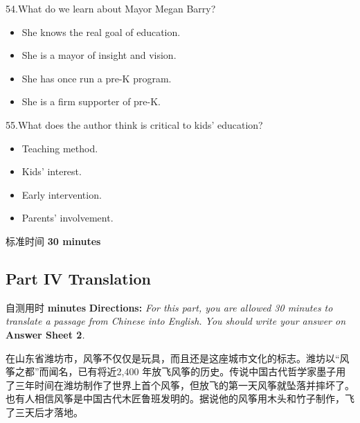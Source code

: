 \documentclass[UTF8,11pt]{ctexart}
\begin{document}
54.What do we learn about Mayor Megan Barry?


\begin{itemize}[leftmargin=2em,itemsep=.2em,topsep=.4em]\item[A.] She knows the real goal of education.
\item[B.] She is a mayor of insight and vision.
\item[C.] She has once run a pre-K program.
\item[D.] She is a firm supporter of pre-K.
\end{itemize}

55.What does the author think is critical to kids’ education?


\begin{itemize}[leftmargin=2em,itemsep=.2em,topsep=.4em]\item[A.] Teaching method.
\item[B.] Kids’ interest.
\item[C.] Early intervention.
\item[D.] Parents’ involvement.
\end{itemize}

标准时间 \textbf{30 minutes}


\subsection*{\textbf{Part IV} \textbf{Translation}}


自测用时 \textbf{minutes} \textbf{Directions:}\textit{ For this part, you are allowed 30 minutes to translate a passage from Chinese into English. You should} \textit{write your answer on}\textbf{ Answer Sheet 2}\textit{.}


在山东省潍坊市，风筝不仅仅是玩具，而且还是这座城市文化的标志。潍坊以“风筝之都”而闻名，已有将近2,400 年放飞风筝的历史。传说中国古代哲学家墨子用了三年时间在潍坊制作了世界上首个风筝，但放飞的第一天风筝就坠落并摔坏了。也有人相信风筝是中国古代木匠鲁班发明的。据说他的风筝用木头和竹子制作，飞了三天后才落地。
\end{document}
